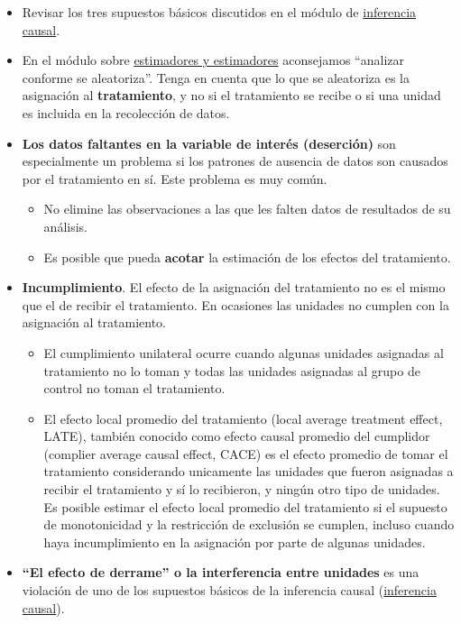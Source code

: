 \documentclass[12pt,spanish,]{book}
\begin{document}
\begin{itemize}
\item
  Revisar los tres supuestos básicos discutidos en el módulo de \href{inferencia-causal.html}{inferencia causal}.
\item
  En el módulo sobre \href{estimandos-y-estimadores.html}{estimadores y estimadores} aconsejamos ``analizar conforme se aleatoriza''. Tenga en cuenta que lo que se aleatoriza es la asignación al \textbf{tratamiento}, y no si el tratamiento se recibe o si una unidad es incluida en la recolección de datos.
\item
  \textbf{Los datos faltantes en la variable de interés (deserción)} son especialmente un problema si los patrones de ausencia de datos son causados por el tratamiento en sí. Este problema es muy común.

  \begin{itemize}
  \item
    No elimine las observaciones a las que les falten datos de resultados de su análisis.
  \item
    Es posible que pueda \textbf{acotar} la estimación de los efectos del tratamiento.
  \end{itemize}
\item
  \textbf{Incumplimiento}. El efecto de la asignación del tratamiento no es el mismo que el de recibir el tratamiento. En ocasiones las unidades no cumplen con la asignación al tratamiento.

  \begin{itemize}
  \item
    El cumplimiento unilateral ocurre cuando algunas unidades asignadas al tratamiento no lo toman y todas las unidades asignadas al grupo de control no toman el tratamiento.
  \item
    El efecto local promedio del tratamiento (local average treatment effect, LATE), también conocido como efecto causal promedio del cumplidor (complier average causal effect, CACE) es el efecto promedio de tomar el tratamiento considerando unicamente las unidades que fueron asignadas a recibir el tratamiento y sí lo recibieron, y ningún otro tipo de unidades. Es posible estimar el efecto local promedio del tratamiento si el supuesto de monotonicidad y la restricción de exclusión se cumplen, incluso cuando haya incumplimiento en la asignación por parte de algunas unidades.
  \end{itemize}
\item
  \textbf{``El efecto de derrame'' o la interferencia entre unidades} es una violación de uno de los supuestos básicos de la inferencia causal (\href{causalinference.html}{inferencia causal}).


\end{itemize}
\end{document}
